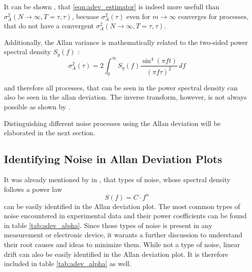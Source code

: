 It can be shown \cite{psd_to_adev}, that \ref{eqn:adev_estimator} is indeed more usefull than $\sigma_A^2(N\to\infty,T=\tau,\tau)$, becuase $\sigma_A^2(\tau)$ even for $m \to \infty$ converges for processes, that do not have a convergent $\sigma_A^2(N\to\infty,T=\tau,\tau)$.

Additionally, the Allan variance is mathematically related to the two-sided power spectral density $S_y(f)$ \cite{psd_to_adev}:
\begin{equation}
    \sigma_A^2(\tau) = 2 \int_0^\infty S_y(f) \frac{\sin^4\left( \pi f t \right)}{(\pi f \tau)^2}\,df
\end{equation}

and therefore all processes, that can be seen in the power spectral density can also be seen in the allan deviation. The inverse transform, however, is not always possible as shown by \citeauthor{inverse_adev} \cite{inverse_adev}.

Distinguishing different noise processes using the Allan deviation will be elaborated in the next section.

\subsection{Identifying Noise in Allan Deviation Plots}
It was already mentioned by \citeauthor{adev} in \cite{adev}, that types of noise, whose spectral density follows a power law
\begin{equation}
    S(f) = C \cdot f^\alpha
\end{equation}
can be easily identified in the Allan deviation plot. The most common types of noise encountered in experimental data and their power coefficients can be found in table \ref{tab:adev_alpha}. Since those types of noise is present in any measurement or electronic device, it warants a further discussion to understand their root causes and ideas to minimize them. While not a type of noise, linear drift can also be easily identified in the Allan deviation plot. It is therefore included in table \ref{tab:adev_alpha} as well.

